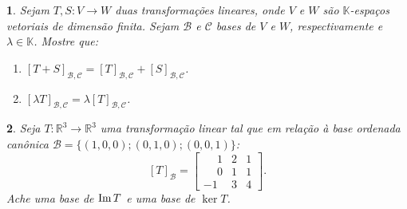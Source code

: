\documentclass[12pt]{exam}
\newtheorem{exercicio}{}
\newcommand{\im}{{\rm Im\,}}
\newcommand{\real}{\mathbb{R}}
\newcommand{\cp}[1]{\mathbb{#1}}
\begin{document}
\begin{exercicio}
  Sejam $T, S : V \to W$ duas transforma\c{c}\~oes lineares, onde $V$ e $W$ s\~ao $\cp{K}$-espa\c{c}os vetoriais de dimens\~ao finita. Sejam $\mathcal{B}$ e $\mathcal{C}$ bases de $V$ e $W$, respectivamente e $\lambda \in \cp{K}$. Mostre que:
  \begin{enumerate}[label=({\alph*})]
    \item $[T + S]_{\mathcal{B}, \mathcal{C}} = [T]_{\mathcal{B}, \mathcal{C}} + [S]_{\mathcal{B}, \mathcal{C}}$.
    \item $[\lambda T]_{\mathcal{B}, \mathcal{C}} = \lambda [T]_{\mathcal{B}, \mathcal{C}}$.
  \end{enumerate}
\end{exercicio}

\begin{exercicio}
  Seja $T : \real^3 \to \real^3$ uma transforma\c{c}\~ao linear tal que em rela\c{c}\~ao \`a base ordenada can\^onica $\mathcal{B} = \{(1,0,0); (0,1,0); (0,0,1)\}$:
  \[
    [T]_\mathcal{B} =\begin{bmatrix}
      \phantom{-}1 & 2 & 1\\
      \phantom{-} 0 & 1 & 1\\
      -1 & 3 & 4
    \end{bmatrix}.
  \]
  Ache uma base de $\im T$ e uma base de $\ker T$.
\end{exercicio}
\end{document}
